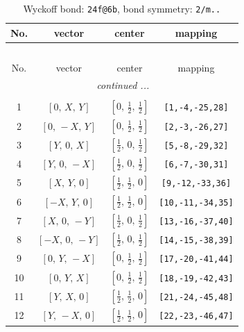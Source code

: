 \documentclass[fleqn,8pt]{jsarticle}
\begin{document}
\renewcommand{\arraystretch}{1.2}
\begin{longtable}{cccc}
\caption{Wyckoff bond: {\tt 24f@6b}, bond symmetry: {\tt 2/m..}}
 \\
 \hline \hline
No. & vector & center & mapping \\ \hline \endfirsthead

\multicolumn{3}{l}{\tablename\ \thetable{}} \\
 \hline \hline
No. & vector & center & mapping \\ \hline \endhead

 \hline \hline
\multicolumn{3}{r}{\footnotesize\it continued ...} \\ \endfoot

 \hline \hline
\multicolumn{3}{r}{} \\ \endlastfoot

1 & $\left[ 0,\, X,\, Y \right]$ & $\left[ 0,\, \frac{1}{2},\, \frac{1}{2} \right]$ & {\tt [1,-4,-25,28]} \\ \hline
2 & $\left[ 0,\, - X,\, Y \right]$ & $\left[ 0,\, \frac{1}{2},\, \frac{1}{2} \right]$ & {\tt [2,-3,-26,27]} \\ \hline
3 & $\left[ Y,\, 0,\, X \right]$ & $\left[ \frac{1}{2},\, 0,\, \frac{1}{2} \right]$ & {\tt [5,-8,-29,32]} \\ \hline
4 & $\left[ Y,\, 0,\, - X \right]$ & $\left[ \frac{1}{2},\, 0,\, \frac{1}{2} \right]$ & {\tt [6,-7,-30,31]} \\ \hline
5 & $\left[ X,\, Y,\, 0 \right]$ & $\left[ \frac{1}{2},\, \frac{1}{2},\, 0 \right]$ & {\tt [9,-12,-33,36]} \\ \hline
6 & $\left[ - X,\, Y,\, 0 \right]$ & $\left[ \frac{1}{2},\, \frac{1}{2},\, 0 \right]$ & {\tt [10,-11,-34,35]} \\ \hline
7 & $\left[ X,\, 0,\, - Y \right]$ & $\left[ \frac{1}{2},\, 0,\, \frac{1}{2} \right]$ & {\tt [13,-16,-37,40]} \\ \hline
8 & $\left[ - X,\, 0,\, - Y \right]$ & $\left[ \frac{1}{2},\, 0,\, \frac{1}{2} \right]$ & {\tt [14,-15,-38,39]} \\ \hline
9 & $\left[ 0,\, Y,\, - X \right]$ & $\left[ 0,\, \frac{1}{2},\, \frac{1}{2} \right]$ & {\tt [17,-20,-41,44]} \\ \hline
10 & $\left[ 0,\, Y,\, X \right]$ & $\left[ 0,\, \frac{1}{2},\, \frac{1}{2} \right]$ & {\tt [18,-19,-42,43]} \\ \hline
11 & $\left[ Y,\, X,\, 0 \right]$ & $\left[ \frac{1}{2},\, \frac{1}{2},\, 0 \right]$ & {\tt [21,-24,-45,48]} \\ \hline
12 & $\left[ Y,\, - X,\, 0 \right]$ & $\left[ \frac{1}{2},\, \frac{1}{2},\, 0 \right]$ & {\tt [22,-23,-46,47]} \\
\end{longtable}
\end{document}
